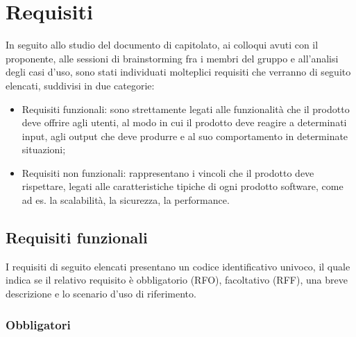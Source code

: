 \section{Requisiti}

In seguito allo studio del documento di capitolato, ai colloqui avuti con il proponente, alle sessioni di
brainstorming fra i membri del gruppo e all'analisi degli casi d'uso, sono stati individuati molteplici requisiti
che verranno di seguito elencati, suddivisi in due categorie:

\begin{itemize}
    \item Requisiti funzionali: sono strettamente legati alle funzionalità che il prodotto deve offrire agli utenti,
    al modo in cui il prodotto deve reagire a determinati input, agli output che deve produrre e al suo comportamento in determinate situazioni;
    \item Requisiti non funzionali: rappresentano i vincoli che il prodotto deve rispettare, legati alle caratteristiche tipiche di
    ogni prodotto software, come ad es. la scalabilità, la sicurezza, la performance.
\end{itemize}

\subsection{Requisiti funzionali}

I requisiti di seguito elencati presentano un codice identificativo univoco, il quale indica se il relativo requisito è
obbligatorio (RFO), facoltativo (RFF), una breve descrizione e lo scenario d'uso di riferimento.

\subsubsection{Obbligatori}

